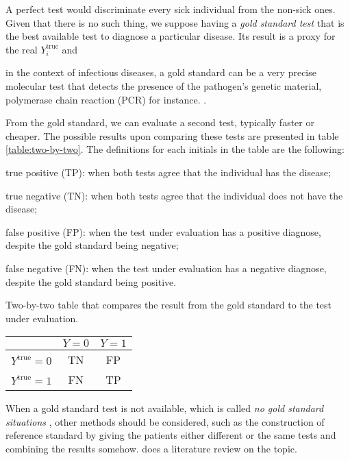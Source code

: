 A perfect test would discriminate every sick individual from the non-sick ones.
Given that there is no such thing, we suppose having a {\em gold standard
test} that is the best available test \cite{versi1992gold} to diagnose a
particular disease. Its result is a proxy for the real $Y^{\mathrm{true}}_i$ and 
\begin{citacao}
  in the context of infectious diseases, a gold standard can be a very precise
  molecular test that detects the presence of the pathogen’s genetic material,
  polymerase chain reaction (PCR) for instance. \cite[p. 125]{bastos2021modelling}.
\end{citacao}
From the gold standard, we can evaluate a second test, typically faster or
cheaper. The possible results upon comparing these tests are presented in
table \ref{table:two-by-two}. The definitions for each initials in the table
are the following: 

\begin{alineas}
  \item true positive (TP): when both tests agree that the individual has the
  disease;
  \item true negative (TN): when both tests agree that the individual does not
  have the disease;
  \item false positive (FP): when the test under evaluation has a positive
  diagnose, despite the gold standard being negative;
  \item false negative (FN): when the test under evaluation has a negative
  diagnose, despite the gold standard being positive.
\end{alineas}

\begin{quadro}[!ht]
  \centering
  \caption[Chart]{Two-by-two table that compares the result from the gold standard to
  the test under evaluation.}
  \begin{tabular}{c|c|c|}
  \cline{2-3}
                                               & $Y = 0$ & $Y = 1$ \\ \hline
  \multicolumn{1}{|c|}{$Y^{\mathrm{true}}= 0$} & TN    & FP    \\ \hline
  \multicolumn{1}{|c|}{ $Y^{\mathrm{true}}= 1$} & FN    & TP    \\ \hline
  \end{tabular}
  \label{table:two-by-two}
\end{quadro}

\begin{remark}
  When a gold standard test is not available, which is called {\em no gold standard
  situations} \cite[p. 1]{rutjes2007evaluation}, other methods should be
  considered, such as the construction of reference standard by giving the
  patients either different or the same tests and combining the results
  somehow. \textcite{rutjes2007evaluation} does a literature
 review on the topic.  
\end{remark}

